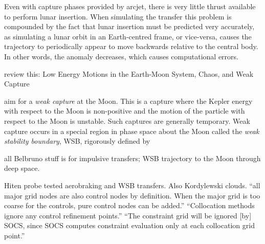 

Even with capture phases provided by arcjet, there is very little thrust available to perform lunar insertion. When simulating the transfer this problem is compounded by the fact that lunar insertion must be predicted very accurately, as simulating a lunar orbit in an Earth-centred frame, or vice-versa, causes the trajectory to periodically appear to move backwards relative to the central body. In other words, the anomaly decreases, which causes computational errors.

review this: Low Energy Motions in the Earth-Moon System, Chaos, and Weak Capture \parencite{Belbruno2007}

aim for a \emph{weak capture} at the Moon. This is a capture where the Kepler energy with respect to the Moon is non-positive and the motion of the particle with respect to the Moon is unstable. Such captures are generally temporary. Weak capture occurs in a special region in phase space about the Moon called the \emph{weak stability boundary}, WSB, rigorously defined by \textcite{Belbruno2004}

all Belbruno stuff is for impulsive transfers; WSB trajectory to the Moon through deep space.

Hiten probe tested aerobraking and WSB transfers. Also Kordylewski clouds.
\cite{ASTOS_guide} \enquote{all major grid nodes are also control nodes by definition. When the major grid is too coarse for the controls, pure control nodes can be added.} \enquote{Collocation methods ignore any control refinement points.} \enquote{The constraint grid will be ignored [by] SOCS, since SOCS computes constraint evaluation only at each collocation grid point.}
